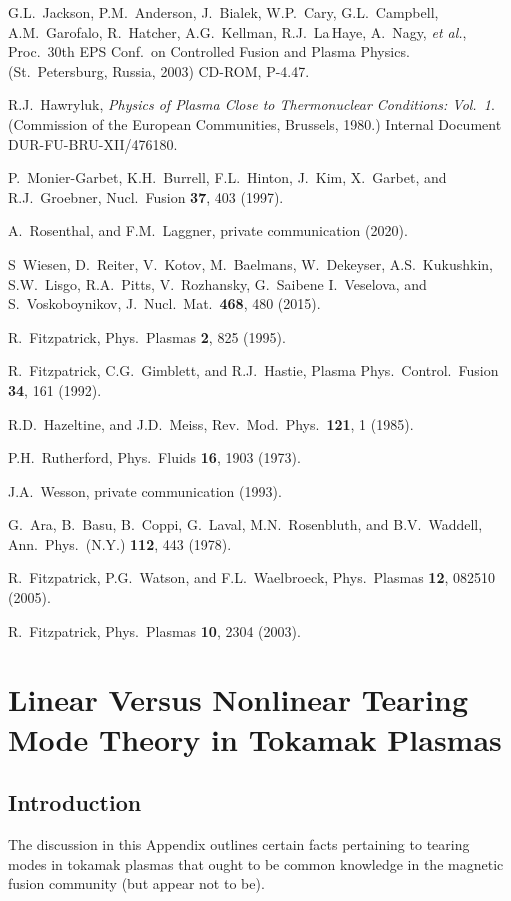 \documentclass[12pt,prb,aps]{revtex4-1}
\begin{document}
\begin{thebibliography}{99}
 G.L.~Jackson, P.M.~Anderson, J.~Bialek, W.P.~Cary, G.L.~Campbell, A.M.~Garofalo,  R.~Hatcher, A.G.~Kellman, R.J.~La\,Haye, A.~Nagy, {\em et al.},  
Proc.\ 30th EPS Conf.\ on Controlled Fusion and Plasma Physics. (St.\ Petersburg, Russia, 2003) CD-ROM, P-4.47.

 R.J.~Hawryluk, {\em Physics of Plasma Close to Thermonuclear Conditions: Vol.~1}. (Commission of the European Communities, Brussels, 1980.) 
Internal Document DUR-FU-BRU-XII/476180.

 P.~Monier-Garbet, K.H.~Burrell, F.L.~Hinton, J.~Kim, X.~Garbet, and R.J.~Groebner,   
Nucl.\ Fusion  {\bf 37}, 403 (1997).

 A.~Rosenthal, and F.M.~Laggner, private communication (2020).

 S~Wiesen, D.~Reiter, V.~Kotov, M.~Baelmans, W.~Dekeyser, A.S.~Kukushkin, S.W.~Lisgo, R.A.~Pitts, V.~Rozhansky, G.~Saibene I.~Veselova, and S.~Voskoboynikov,
J.\ Nucl.\ Mat.\ {\bf 468}, 480 (2015).

 R.~Fitzpatrick,  Phys.\ Plasmas {\bf 2}, 825 (1995).

 R.~Fitzpatrick, C.G.~Gimblett, and R.J.~Hastie, 
Plasma Phys.\ Control.\ Fusion {\bf 34}, 161 (1992).

 R.D.~Hazeltine, and J.D.~Meiss, Rev.\ Mod.\ Phys.\ {\bf 121}, 1 (1985).

 P.H.~Rutherford,  Phys.\ Fluids  {\bf 16}, 1903 (1973).

 J.A.~Wesson, private communication (1993).

 G.~Ara,  B.~Basu, B.~Coppi, G.~Laval, M.N.~Rosenbluth, and B.V.~Waddell, Ann.\ Phys.\ (N.Y.) {\bf 112}, 443 (1978). 

 R.~Fitzpatrick, P.G.~Watson, and F.L.~Waelbroeck, Phys.\ Plasmas {\bf 12}, 082510 (2005).

 R.~Fitzpatrick, Phys.\ Plasmas {\bf 10}, 2304 (2003).

\end{thebibliography}

\appendix
\section{Linear Versus Nonlinear Tearing Mode Theory in Tokamak Plasmas}\label{appa}
\subsection{Introduction}
The discussion in this Appendix outlines certain facts pertaining
to tearing modes in tokamak plasmas that ought to be common knowledge in the 
magnetic fusion community (but appear not to be). 
\end{document}
